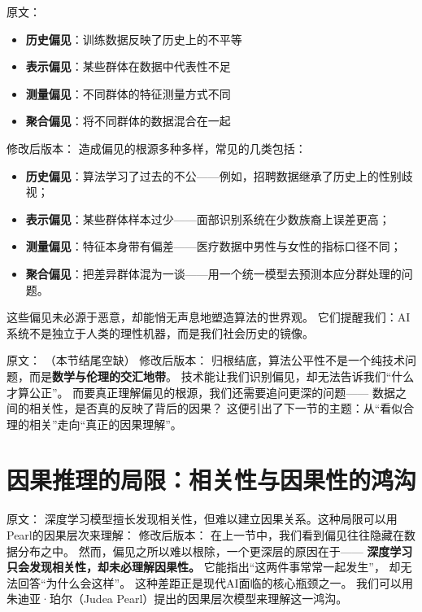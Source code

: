 原文：
\begin{itemize}
\item \textbf{历史偏见}：训练数据反映了历史上的不平等
\item \textbf{表示偏见}：某些群体在数据中代表性不足
\item \textbf{测量偏见}：不同群体的特征测量方式不同
\item \textbf{聚合偏见}：将不同群体的数据混合在一起
\end{itemize}
修改后版本：
造成偏见的根源多种多样，常见的几类包括：  
\begin{itemize}
\item \textbf{历史偏见}：算法学习了过去的不公——例如，招聘数据继承了历史上的性别歧视；  
\item \textbf{表示偏见}：某些群体样本过少——面部识别系统在少数族裔上误差更高；  
\item \textbf{测量偏见}：特征本身带有偏差——医疗数据中男性与女性的指标口径不同；  
\item \textbf{聚合偏见}：把差异群体混为一谈——用一个统一模型去预测本应分群处理的问题。  
\end{itemize}
这些偏见未必源于恶意，却能悄无声息地塑造算法的世界观。  
它们提醒我们：AI系统不是独立于人类的理性机器，而是我们社会历史的镜像。



原文：
（本节结尾空缺）
修改后版本：
归根结底，算法公平性不是一个纯技术问题，而是\textbf{数学与伦理的交汇地带}。  
技术能让我们识别偏见，却无法告诉我们“什么才算公正”。  
而要真正理解偏见的根源，我们还需要追问更深的问题——  
数据之间的相关性，是否真的反映了背后的因果？  
这便引出了下一节的主题：从“看似合理的相关”走向“真正的因果理解”。

\section{因果推理的局限：相关性与因果性的鸿沟}

原文：
深度学习模型擅长发现相关性，但难以建立因果关系。这种局限可以用Pearl的因果层次来理解：
修改后版本：
在上一节中，我们看到偏见往往隐藏在数据分布之中。  
然而，偏见之所以难以根除，一个更深层的原因在于——  
\textbf{深度学习只会发现相关性，却未必理解因果性。}  
它能指出“这两件事常常一起发生”，  
却无法回答“为什么会这样”。  
这种差距正是现代AI面临的核心瓶颈之一。  
我们可以用朱迪亚·珀尔（Judea Pearl）提出的因果层次模型来理解这一鸿沟。



